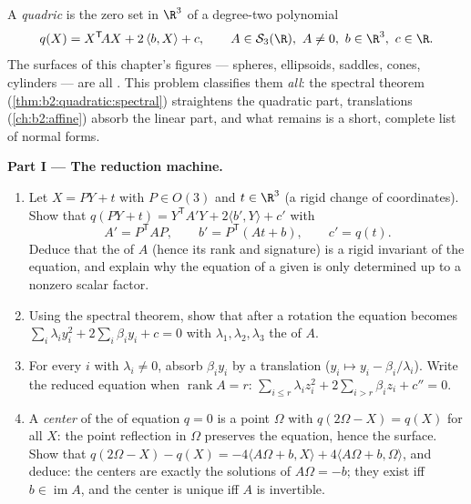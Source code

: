\begin{problem}\label{pb:b2:surfaces:1}
A \emph{quadric} is the zero set in $\R^3$ of a
degree-two polynomial
\[
q(X) = X^{\mathsf T}\!AX + 2\,\langle b, X\rangle + c,
\qquad A \in \mathcal S_3(\R),\ A \neq 0,\ b \in \R^3,\
c \in \R .
\]
The surfaces of this chapter's figures --- spheres,
ellipsoids, saddles, cones, cylinders --- are all .
This problem classifies them \emph{all}: the spectral theorem
(\cref{thm:b2:quadratic:spectral}) straightens the quadratic
part,  translations (\cref{ch:b2:affine}) absorb the
linear part, and what remains is a short, complete list of
normal forms.

\medskip
\noindent\textbf{Part I --- The reduction machine.}
\begin{enumerate}
  \item Let $X = PY + t$ with $P \in O(3)$ and $t \in \R^3$ (a
        rigid change of coordinates). Show that $q(PY + t) =
        Y^{\mathsf T}\!A'Y + 2\langle b', Y\rangle + c'$ with
        \[
        A' = P^{\mathsf T}\!AP, \qquad
        b' = P^{\mathsf T}(At + b), \qquad
        c' = q(t) .
        \]
        Deduce that the  of $A$ (hence its rank and
        signature) is a rigid invariant of the equation, and
        explain why the equation of a given  is only
        determined up to a nonzero scalar factor.
  \item Using the spectral theorem, show that after a rotation
        the equation becomes $\sum_i \lambda_i y_i^2 +
        2\sum_i\beta_iy_i + c = 0$ with $\lambda_1, \lambda_2,
        \lambda_3$ the  of $A$.
  \item For every $i$ with $\lambda_i \neq 0$, absorb
        $\beta_iy_i$ by a translation ($y_i \mapsto y_i -
        \beta_i/\lambda_i$). Write the reduced equation when
        $\operatorname{rank} A = r$: $\sum_{i\leq r}\lambda_i
        z_i^2 + 2\sum_{i > r}\beta_iz_i + c'' = 0$.
  \item A \emph{center} of the  of equation $q = 0$ is
        a point $\Omega$ with $q(2\Omega - X) = q(X)$ for all
        $X$: the point reflection in $\Omega$ preserves the
        equation, hence the surface. Show that $q(2\Omega - X)
        - q(X) = -4\langle A\Omega + b, X\rangle + 4\langle
        A\Omega + b, \Omega\rangle$, and deduce: the centers
        are exactly the solutions of $A\Omega = -b$; they
        exist iff $b \in \operatorname{im}A$, and the center
        is unique iff $A$ is invertible.
\end{enumerate}


\end{problem}
